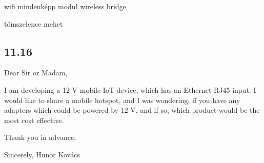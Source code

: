 \documentclass{article}
\begin{document}
	wifi mindenképp
	modul
	wireless bridge
		
	tömszelence mehet
	
	\subsection{11.16}
	
	Dear Sir or Madam,
	
	I am developing a 12 V mobile IoT device, which has an Ethernet RJ45 input. I would like to share a mobile hotspot, and I was wondering, if you have any adapters which could be powered by 12 V, and if so, which product would be the most cost effective.
	
	Thank you in advance,
	
	Sincerely,
	Hunor Kovács
	
\end{document}
